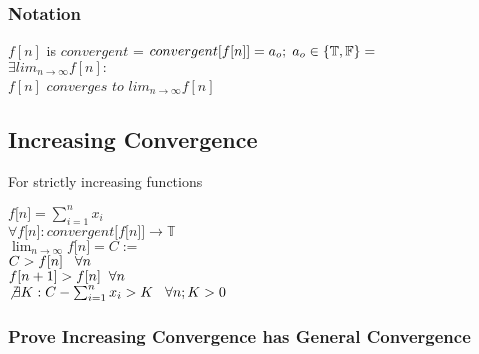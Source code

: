\documentclass[11pt]{article}
\begin{document}
\subsubsection{Notation}
\begin{center}
\vspace{1mm}
$f[n]$ is $convergent$ = $convergent \lbrack f \lbrack n \rbrack \rbrack = a_o; \hspace{1mm} a_o \in \{\mathbb{T},\mathbb{F}\} =$
\\ \vspace{6mm}
$
\exists lim_{n \rightarrow \infty} f[n]:
$
\\ \vspace{2mm}
$
f[n]$ $converges$ $to$ $lim_{n \rightarrow \infty} f[n]
$
\end{center}






\subsection{Increasing Convergence}
For strictly increasing functions
\begin{center}
$ f \lbrack n \rbrack = \sum_{i=1}^{n} x_i$
\\ \vspace{2mm}
$\forall f \lbrack n \rbrack : convergent \lbrack f \lbrack n \rbrack \rbrack \rightarrow \mathbb{T}$
\\ \vspace{2mm}
$ \lim_{n \rightarrow \infty} f \lbrack n \rbrack = C:=$
\\ \vspace{2mm}
$C >  f[n] \hspace{3mm} \forall n$
\\ \vspace{2mm}
$
f[n+1] > f[n] \hspace{2mm} \forall n
$
\\ \vspace{2mm}
$\not \exists K : C - \sum_{i=1}^{n} x_i > K \hspace{3mm} \forall n; K > 0$
\end{center}
\subsubsection{Prove Increasing Convergence has General Convergence}
\end{document}
